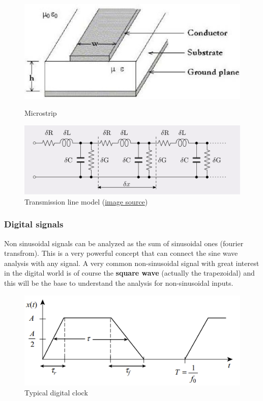 \documentclass[final]{cubedoc}
\begin{document}
	\begin{figure}[h!]
		\centering
		\begin{minipage}[b]{0.4\textwidth}
			\includegraphics[width=\textwidth]{assets/microstrip.jpg}
			\caption{Microstrip \cite{microstrip}}
		\end{minipage}
		\hfill
		\begin{minipage}[b]{0.4\textwidth}
			\includegraphics[width=\textwidth]{assets/distributed_model.png}
			\caption{Transmission line model \small{(\href{https://web.archive.org/web/20200814091245/https://en.wikipedia.org/wiki/Primary_line_constants}{image source})}}
		\end{minipage}
	\end{figure}
	
	
	\subsubsection{Digital signals}
	
	Non sinusoidal signals can be analyzed as the sum of sinusoidal ones (fourier transfrom). This is a very powerful concept that can connect the sine wave analysis with any signal. A very common non-sinusoidal signal with great interest in the digital world is of course the \textbf{square wave} (actually the trapezoidal) and this will be the base to understand the analysis for non-sinusoidal inputs.
	
	\begin{figure}[h!]
		\centering
		\includegraphics[keepaspectratio, width = \textwidth]{assets/clock_signal.png}
		\caption{Typical digital clock \cite[p.2]{paul2011transmission}}
	\end{figure}
	
\end{document}
